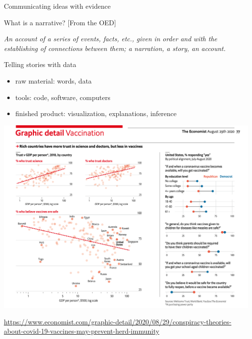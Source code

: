 \documentclass[table]{beamer}\usepackage[]{graphicx}\usepackage[]{color}
\begin{document}
\begin{frame}{Communicating ideas with evidence}

\begin{block}{What is a narrative? [From the OED]}

\em An account of a series of events, facts, etc., given in order and with the establishing of connections between them; a narration, a story, an account.

\end{block}

\bigskip

\begin{block}{Telling stories with data}

\begin{itemize}
	\item raw material: words, data
	\item tools: code, software, computers
	\item finished product: visualization, explanations, inference
\end{itemize}

\end{block}


\end{frame}



%
%
%


\begin{frame}

\centering 

\includegraphics[width=\textwidth]{figure-static/graphic-detail-vaccination.png}

\tiny \url{https://www.economist.com/graphic-detail/2020/08/29/conspiracy-theories-about-covid-19-vaccines-may-prevent-herd-immunity}

\end{frame}
\end{document}
